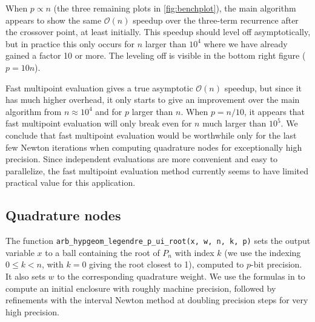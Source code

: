\documentclass[nohypdvips,review]{siamart0216}
\newcommand{\OO}{\mathcal{O}}
\begin{document}
When $p \propto n$ (the three remaining plots in \cref{fig:benchplot}), the main algorithm
appears to show the same $\OO(n)$ speedup
over the three-term recurrence after the crossover point, at least initially.
This speedup should level off asymptotically, but
in practice this only occurs for $n$ larger than $10^4$
where we have already gained a factor 10 or more.
The leveling off is visible in the bottom right figure ($p = 10n$).

Fast multipoint evaluation gives a true asymptotic $\OO(n)$ speedup,
but since it has much higher overhead,
it only starts to give an improvement over
the main algorithm from $n \approx 10^4$
and for $p$ larger than $n$.
When $p = n / 10$, it appears that
fast multipoint evaluation will only break even for $n$ much larger than $10^5$.
We conclude that fast multipoint evaluation would be
worthwhile only for the last few Newton iterations
when computing quadrature nodes for exceptionally high precision.
Since independent evaluations are more convenient and easy to parallelize,
the fast multipoint evaluation method
currently seems to have limited practical value for this application.

\subsection{Quadrature nodes}

The function
\texttt{arb\_hypgeom\_legendre\_p\_ui\_root(x, w, n, k, p)}
sets the output variable
$x$ to a ball containing the root of $P_n$ with index $k$ (we use the indexing
$0 \le k < n$, with $k = 0$ giving the root closest to 1),
computed to $p$-bit precision.
It also sets $w$ to the corresponding quadrature weight.
We use the formulas in \cite{petras1999computation} to
compute an initial enclosure with roughly machine precision,
followed by refinements with the interval Newton method
at doubling precision steps for very high precision.
\end{document}
